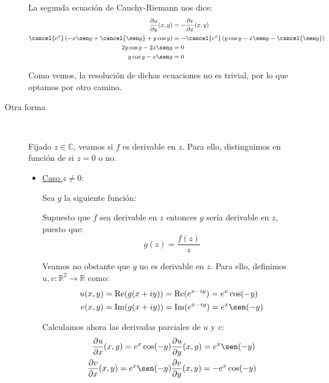 \documentclass[12pt]{article}
\renewcommand{\Re}{\operatorname{Re}} %
\renewcommand{\Im}{\operatorname{Im}}
\begin{document}
\begin{ejercicio}[3 puntos]
\begin{description}
        La segunda ecuación de Cauchy-Riemann nos dice:
        \begin{align*}
            \frac{\partial u}{\partial y}(x,y) &= -\frac{\partial v}{\partial x}(x,y)\\
            \cancel{e^x}\left(-x\sen y + \cancel{\sen y} + y\cos y\right) &= -\cancel{e^x}\left(y\cos y - x\sen y - \cancel{\sen y}\right)\\
            2y\cos y - 2x\sen y &= 0\\
            y\cos y - x\sen y &= 0
        \end{align*}

        Como vemos, la resolución de dichas ecuaciones no es trivial, por lo que optamos por otro camino.


        \item[Otra forma]~
        
        Fijado $z\in \mathbb{C}$, veamos si $f$ es derivable en $z$. Para ello, distinguimos en función de si $z=0$ o no.
        \begin{itemize}
            \item \ul{Caso $z\neq 0$}:
            
            Sea $g$ la siguiente función:

            Supuesto que $f$ sea derivable en $z$ entonces $g$ sería derivable en $z$, puesto que:
            \begin{equation*}
                g(z) = \frac{f(z)}{z}
            \end{equation*}

            Veamos no obstante que $g$ no es derivable en $z$. Para ello, definimos $u,v:\mathbb{R}^2\to\mathbb{R}$ como:
            \begin{align*}
                u(x,y) &= \Re(g(x+iy)) = \Re(e^{x-iy}) = e^x\cos (-y)\\
                v(x,y) &= \Im(g(x+iy)) = \Im(e^{x-iy}) = e^x\sen (-y)
            \end{align*}

            Calculamos ahora las derivadas parciales de $u$ y $v$:
            \begin{align*}
                \frac{\partial u}{\partial x}(x,y) = e^x\cos (-y)&
                \frac{\partial u}{\partial y}(x,y) = e^x\sen (-y)\\
                \frac{\partial v}{\partial x}(x,y) = e^x\sen (-y)&
                \frac{\partial v}{\partial y}(x,y) = -e^x\cos (-y)
            \end{align*}


\end{itemize}
\end{description}
\end{ejercicio}
\end{document}
